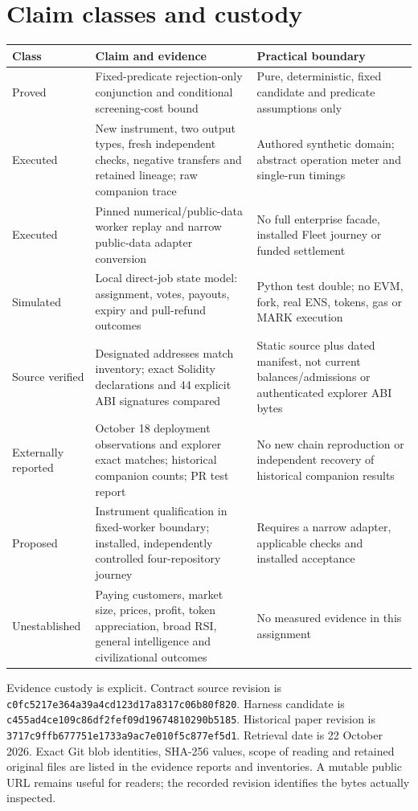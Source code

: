 \documentclass[11pt,letterpaper]{article}
\begin{document}
\section{Claim classes and custody}
\begin{longtable}{@{}P{2.5cm}P{5.55cm}P{6.45cm}@{}}\toprule
Class & Claim and evidence & Practical boundary\\\midrule\endhead
Proved & Fixed-predicate rejection-only conjunction and conditional screening-cost bound & Pure, deterministic, fixed candidate and predicate assumptions only\\
Executed & New instrument, two output types, fresh independent checks, negative transfers and retained lineage; raw companion trace & Authored synthetic domain; abstract operation meter and single-run timings\\
Executed & Pinned numerical/public-data worker replay and narrow public-data adapter conversion & No full enterprise facade, installed Fleet journey or funded settlement\\
Simulated & Local direct-job state model: assignment, votes, payouts, expiry and pull-refund outcomes & Python test double; no EVM, fork, real ENS, tokens, gas or MARK execution\\
Source verified & Designated addresses match inventory; exact Solidity declarations and 44 explicit ABI signatures compared & Static source plus dated manifest, not current balances/admissions or authenticated explorer ABI bytes\\
Externally reported & October 18 deployment observations and explorer exact matches; historical companion counts; PR test report & No new chain reproduction or independent recovery of historical companion results\\
Proposed & Instrument qualification in fixed-worker boundary; installed, independently controlled four-repository journey & Requires a narrow adapter, applicable checks and installed acceptance\\
Unestablished & Paying customers, market size, prices, profit, token appreciation, broad RSI, general intelligence and civilizational outcomes & No measured evidence in this assignment\\\bottomrule
\end{longtable}

Evidence custody is explicit. Contract source revision is \nolinkurl{c0fc5217e364a39a4cd123d17a8317c06b80f820}. Harness candidate is \nolinkurl{c455ad4ce109c86df2fef09d19674810290b5185}. Historical paper revision is \nolinkurl{3717c9ffb677751e1733a9ac7e010f5c877ef5d1}. Retrieval date is 22 October 2026. Exact Git blob identities, SHA-256 values, scope of reading and retained original files are listed in the evidence reports and inventories. A mutable public URL remains useful for readers; the recorded revision identifies the bytes actually inspected.
\end{document}

